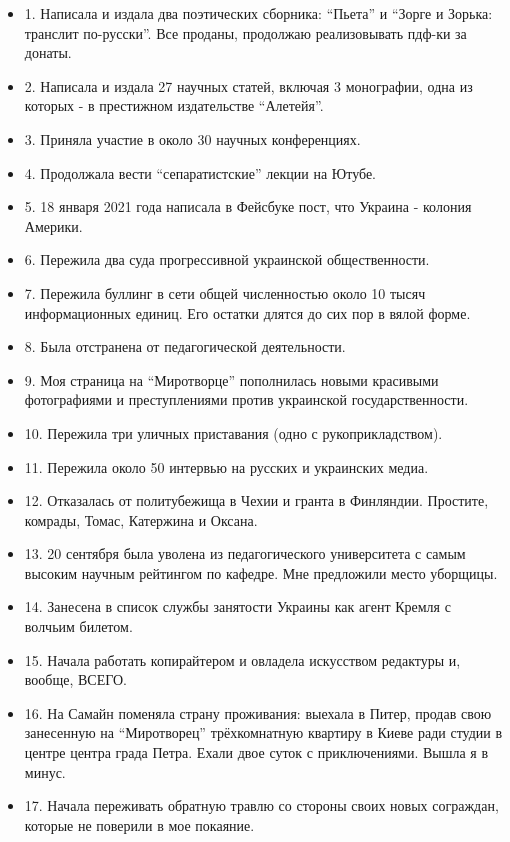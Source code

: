 \begin{itemize}
  \item 1. Написала и издала два поэтических сборника: \enquote{Пьета} и \enquote{Зорге и Зорька: транслит по-русски}. Все проданы, продолжаю реализовывать пдф-ки за донаты.
  \item 2. Написала и издала 27 научных статей, включая 3 монографии, одна из которых - в престижном издательстве \enquote{Алетейя}.
  \item 3. Приняла участие в около 30 научных конференциях.
  \item 4. Продолжала вести \enquote{сепаратистские} лекции на Ютубе.
  \item 5. 18 января 2021 года написала в Фейсбуке пост, что Украина - колония Америки.
  \item 6. Пережила два суда прогрессивной украинской общественности.
  \item 7. Пережила буллинг в сети общей численностью около 10 тысяч информационных единиц. Его остатки длятся до сих пор в вялой форме.
  \item 8. Была отстранена от педагогической деятельности.
  \item 9. Моя страница на \enquote{Миротворце} пополнилась новыми красивыми фотографиями и преступлениями против украинской государственности.
  \item 10. Пережила три уличных приставания (одно с рукоприкладством).
  \item 11. Пережила около 50 интервью на русских и украинских медиа.
  \item 12. Отказалась от политубежища в Чехии и гранта в Финляндии. Простите, комрады, Томас, Катержина и Оксана.
  \item 13. 20 сентября была уволена из педагогического университета с самым высоким научным рейтингом по кафедре. Мне предложили место уборщицы.
  \item 14. Занесена в список службы занятости Украины как агент Кремля с волчьим билетом.
  \item 15. Начала работать копирайтером и овладела искусством редактуры и, вообще, ВСЕГО.
  \item 16. На Самайн поменяла страну проживания: выехала в Питер, продав свою занесенную на \enquote{Миротворец} трёхкомнатную квартиру в Киеве ради студии в центре центра града Петра. Ехали двое суток с приключениями. Вышла я в минус. 
  \item 17. Начала переживать обратную травлю со стороны своих новых сограждан, которые не поверили в мое покаяние.

\end{itemize}
